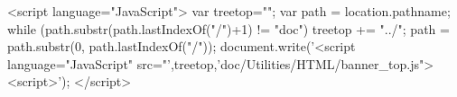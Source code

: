 \documentclass[11pt]{article}
\begin{document}
\begin{rawhtml}
<script language="JavaScript">
var treetop="";
var path = location.pathname;
while (path.substr(path.lastIndexOf("/")+1) != "doc") {
treetop += "../";
path = path.substr(0, path.lastIndexOf("/"));
}
document.write('<script language="JavaScript" src="',treetop,'doc/Utilities/HTML/banner_top.js"><\/script>');
</script>
\end{rawhtml}


\newpage
\tableofcontents
\newpage



\newpage




%

%



\newpage
%
\newpage
%

\newpage


\newpage
\printindex
\end{document}
